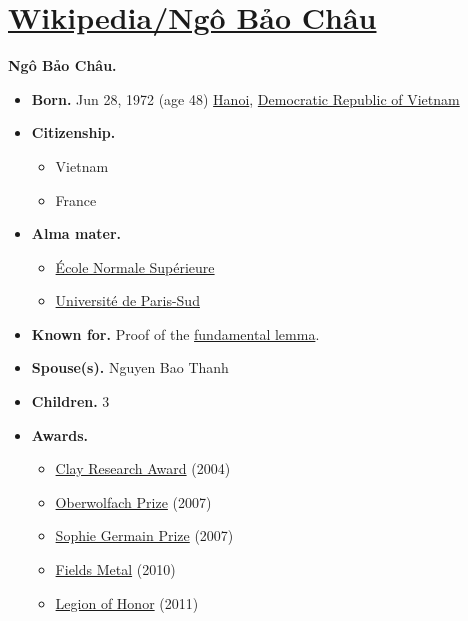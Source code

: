 \documentclass{book}
\numberwithin{equation}{section}
\begin{document}
\chapter{\href{https://en.wikipedia.org/wiki/Ngo_Bao_Chau}{Wikipedia/Ngô Bảo Châu}}

\textbf{Ngô Bảo Châu.}
\begin{itemize}
    \item \textbf{Born.} Jun 28, 1972 (age 48)
    \href{https://en.wikipedia.org/wiki/Hanoi}{Hanoi}, \href{https://en.wikipedia.org/wiki/Democratic_Republic_of_Vietnam}{Democratic Republic of Vietnam}
    \item \textbf{Citizenship.}
    \begin{itemize}
        \item Vietnam
        \item France
    \end{itemize}
    \item \textbf{Alma mater.}
    \begin{itemize}
        \item \href{https://en.wikipedia.org/wiki/%C3%89cole_Normale_Sup%C3%A9rieure}{École Normale Supérieure}
        \item \href{https://en.wikipedia.org/wiki/Universit%C3%A9_de_Paris-Sud}{Université de Paris-Sud}
    \end{itemize}
    \item \textbf{Known for.} Proof of the \href{https://en.wikipedia.org/wiki/Fundamental_lemma_(Langlands_program)}{fundamental lemma}.
    \item \textbf{Spouse(s).} Nguyen Bao Thanh
    \item \textbf{Children.} 3
    \item \textbf{Awards.}
    \begin{itemize}
        \item \href{https://en.wikipedia.org/wiki/Clay_Research_Award}{Clay Research Award} (2004)
        \item \href{https://en.wikipedia.org/wiki/Oberwolfach_Prize}{Oberwolfach Prize} (2007)
        \item \href{https://en.wikipedia.org/wiki/Sophie_Germain_Prize}{Sophie Germain Prize} (2007)
        \item \href{https://en.wikipedia.org/wiki/Fields_Medal}{Fields Metal} (2010)
        \item \href{https://en.wikipedia.org/wiki/Legion_of_Honour}{Legion of Honor} (2011)
    \end{itemize}
\end{itemize}
\end{document}

